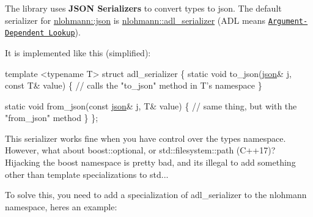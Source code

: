 The library uses {\bfseries J\+S\+ON Serializers} to convert types to json. The default serializer for {\ttfamily \hyperlink{namespacenlohmann_a2bfd99e845a2e5cd90aeaf1b1431f474}{nlohmann\+::json}} is {\ttfamily \hyperlink{structnlohmann_1_1adl__serializer}{nlohmann\+::adl\+\_\+serializer}} (A\+DL means \href{http://en.cppreference.com/w/cpp/language/adl}{\tt Argument-\/\+Dependent Lookup}).

It is implemented like this (simplified)\+:


\begin{DoxyCode}
\textcolor{keyword}{template} <\textcolor{keyword}{typename} T>
\textcolor{keyword}{struct }adl\_serializer \{
    \textcolor{keyword}{static} \textcolor{keywordtype}{void} to\_json(\hyperlink{classnlohmann_1_1basic__json}{json}& j, \textcolor{keyword}{const} T& value) \{
        \textcolor{comment}{// calls the "to\_json" method in T's namespace}
    \}

    \textcolor{keyword}{static} \textcolor{keywordtype}{void} from\_json(\textcolor{keyword}{const} \hyperlink{classnlohmann_1_1basic__json}{json}& j, T& value) \{
        \textcolor{comment}{// same thing, but with the "from\_json" method}
    \}
\};
\end{DoxyCode}


This serializer works fine when you have control over the type\textquotesingle{}s namespace. However, what about {\ttfamily boost\+::optional}, or {\ttfamily std\+::filesystem\+::path} (C++17)? Hijacking the {\ttfamily boost} namespace is pretty bad, and it\textquotesingle{}s illegal to add something other than template specializations to {\ttfamily std}...

To solve this, you need to add a specialization of {\ttfamily adl\+\_\+serializer} to the {\ttfamily nlohmann} namespace, here\textquotesingle{}s an example\+:


